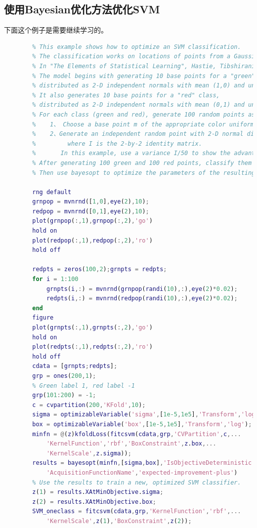     \subsection{使用Bayesian优化方法优化SVM}
        \par
        下面这个例子是需要继续学习的。
        \begin{lstlisting}[language = Matlab]
        %% 使用Bayesian优化方法优化交叉验证的SVM----要进一步学习
        % This example shows how to optimize an SVM classification.
        % The classification works on locations of points from a Gaussian mixture model.
        % In "The Elements of Statistical Learning", Hastie, Tibshirani, and Friedman (2009), page 17 describes the model.
        % The model begins with generating 10 base points for a "green" class,
        % distributed as 2-D independent normals with mean (1,0) and unit variance.
        % It also generates 10 base points for a "red" class,
        % distributed as 2-D independent normals with mean (0,1) and unit variance.
        % For each class (green and red), generate 100 random points as follows:
        %    1、 Choose a base point m of the appropriate color uniformly at random.
        %    2、Generate an independent random point with 2-D normal distribution with mean m and variance I/5,
        %         where I is the 2-by-2 identity matrix.
        %       In this example, use a variance I/50 to show the advantage of optimization more clearly.
        % After generating 100 green and 100 red points, classify them using fitcsvm.
        % Then use bayesopt to optimize the parameters of the resulting SVM model with respect to cross validation.

        rng default
        grnpop = mvnrnd([1,0],eye(2),10);
        redpop = mvnrnd([0,1],eye(2),10);
        plot(grnpop(:,1),grnpop(:,2),'go')
        hold on
        plot(redpop(:,1),redpop(:,2),'ro')
        hold off

        redpts = zeros(100,2);grnpts = redpts;
        for i = 1:100
            grnpts(i,:) = mvnrnd(grnpop(randi(10),:),eye(2)*0.02);
            redpts(i,:) = mvnrnd(redpop(randi(10),:),eye(2)*0.02);
        end
        figure
        plot(grnpts(:,1),grnpts(:,2),'go')
        hold on
        plot(redpts(:,1),redpts(:,2),'ro')
        hold off
        cdata = [grnpts;redpts];
        grp = ones(200,1);
        % Green label 1, red label -1
        grp(101:200) = -1;
        c = cvpartition(200,'KFold',10);
        sigma = optimizableVariable('sigma',[1e-5,1e5],'Transform','log');
        box = optimizableVariable('box',[1e-5,1e5],'Transform','log');
        minfn = @(z)kfoldLoss(fitcsvm(cdata,grp,'CVPartition',c,...
            'KernelFunction','rbf','BoxConstraint',z.box,...
            'KernelScale',z.sigma));
        results = bayesopt(minfn,[sigma,box],'IsObjectiveDeterministic',true,...
            'AcquisitionFunctionName','expected-improvement-plus')
        % Use the results to train a new, optimized SVM classifier.
        z(1) = results.XAtMinObjective.sigma;
        z(2) = results.XAtMinObjective.box;
        SVM_oneclass = fitcsvm(cdata,grp,'KernelFunction','rbf',...
            'KernelScale',z(1),'BoxConstraint',z(2));


\end{lstlisting}
